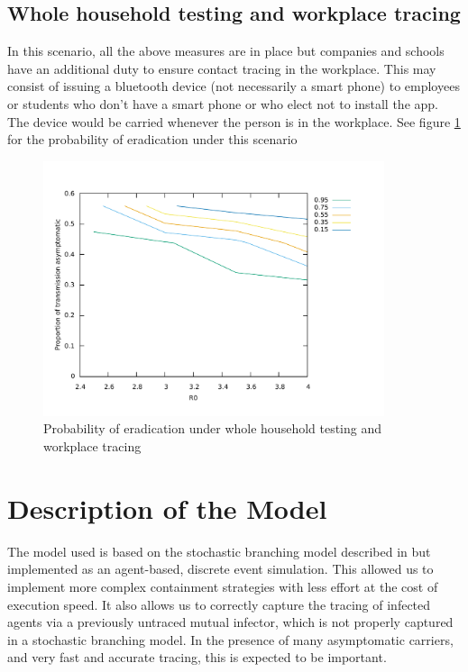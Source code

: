 \documentclass{article}
\begin{document}
\subsection{Whole household testing and workplace tracing}

In this scenario, all the above measures are in place but companies and schools have an additional duty to ensure contact tracing in the workplace. This may consist of issuing a bluetooth device (not necessarily a smart phone) to employees or students who don't have a smart phone or who elect not to install the app. The device would be carried whenever the person is in the workplace. See figure \ref{householdAndWorkplaceEnforcement} for the probability of eradication under this scenario

\begin{figure}
\begin{center}
\includegraphics[width = 10cm]{workplaceAndHouseholdEnforcement.pdf}
\end{center}
\caption{Probability of eradication under whole household testing and workplace tracing}
\label{householdAndWorkplaceEnforcement}
\end{figure}

\section{Description of the Model}

The model used is based on the stochastic branching model described in \cite{hellewellfeasibility} but implemented as an agent-based, discrete event simulation. This allowed us to implement more complex containment strategies with less effort at the cost of execution speed. It also allows us to correctly capture the tracing of infected agents via a previously untraced mutual infector, which is not properly captured in a stochastic branching model. In the presence of many asymptomatic carriers, and very fast and accurate tracing, this is expected to be important.
\end{document}
